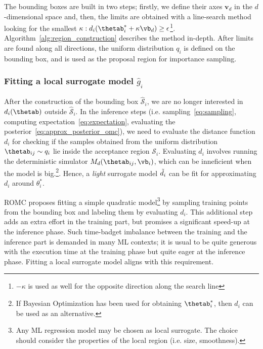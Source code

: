 The bounding boxes are built in two steps; firstly, we define their
axes $\mathbf{v}_d$ in the $d$-dimensional space and, then, the limits
are obtained with a line-search method looking for the smallest
$\kappa: d_i(\thetab_i^* + \kappa \vb_d) \geq
\epsilon$\footnote{$-\kappa$ is used as well for the opposite
  direction along the search
  line}. Algorithm~\ref{alg:region_construction} describes the method
in-depth. After limits are found along all directions, the uniform
distribution $q_i$ is defined on the bounding box, and is used as the
proposal region for importance sampling.

\subsubsection*{Fitting a local surrogate model $\hat{g}_i$}

After the construction of the bounding box $\mathcal{\hat{S}}_i$, we
are no longer interested in $d_i(\thetab)$ outside
$\mathcal{\hat{S}}_i$. In the inference steps
(i.e. sampling~\eqref{eq:sampling}, computing
expectation~\eqref{eq:expectation}, evaluating the
posterior~\eqref{eq:approx_posterior_omc}), we need to evaluate the
distance function $d_i$ for checking if the samples obtained from the
uniform distribution $\thetab_{ij} \sim q_i$ lie inside the acceptance
region $\mathcal{S}_i$. Evaluating $d_i$ involves running the
deterministic simulator $M_d(\thetab_{ij}, \vb_i)$, which can be
inneficient when the model is big.\footnote{If Bayesian Optimization
  has been used for obtaining $\thetab_i^*$, then $\hat{d}_i$ can be
  used as an alternative.}. Hence, a \emph{light} surrogate model
$\Tilde{d}_i$ can be fit for approximating $d_i$ around $\theta_i^*$.

ROMC proposes fitting a simple quadratic model\footnote{Any ML
  regression model may be chosen as local surrogate. The choice should
  consider the properties of the local region (i.e. size,
  smoothness). } by sampling training points from the bounding box and
labeling them by evaluating $d_i$. This additional step adds an extra
effort in the training part, but promises a significant speed-up at
the inference phase. Such time-badget imbalance between the training
and the inference part is demanded in many ML contexts; it is usual to
be quite generous with the execution time at the training phase but
quite eager at the inference phase. Fitting a local surrogate model
aligns with this requirement.
